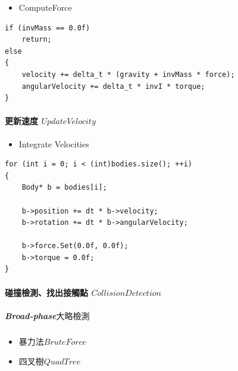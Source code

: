 \begin{itemize}
    \item{ComputeForce}
\end{itemize}

\begin{lstlisting}
if (invMass == 0.0f)
    return;
else
{
    velocity += delta_t * (gravity + invMass * force);
    angularVelocity += delta_t * invI * torque;
}
\end{lstlisting}


\paragraph{更新速度 \(Update Velocity\)}

\begin{itemize}
    \item{Integrate Velocities}
\end{itemize}

\newpage
\begin{lstlisting}
for (int i = 0; i < (int)bodies.size(); ++i)
{
    Body* b = bodies[i];

    b->position += dt * b->velocity;
    b->rotation += dt * b->angularVelocity;

    b->force.Set(0.0f, 0.0f);
    b->torque = 0.0f;
}
\end{lstlisting}


\paragraph{碰撞檢測、找出接觸點 \(Collision Detection\)}

\subparagraph{Broad-phase\(大略檢測\)}

\begin{itemize}
    \item{暴力法\(Brute Force\)}
    \item{四叉樹\(QuadTree\)}   
\end{itemize}

